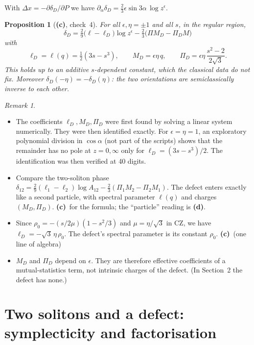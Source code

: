 \documentclass[11pt,a4paper]{article}
\newcommand{\Lc}{\textsf{\textbf{(c)}}}\newcommand{\Ld}{\textsf{\textbf{(d)}}}
\newtheorem{proposition}{Proposition}\theoremstyle{remark}\newtheorem{remark}{Remark}
\begin{document}
With $\Delta x=-\partial\delta_D/\partial P$ we have $\partial_\alpha\delta_D=\tfrac23\epsilon\sin3\alpha\,\log z^\epsilon$.

\begin{proposition}[\Lc, check~4]\label{prop:dD}
For all $\epsilon,\eta=\pm1$ and all $s$, in the regular region,
\begin{equation}\label{eq:dD}
\boxed{\ \delta_D=\tfrac29\big(\ell-\ell_D\big)\log z^{\epsilon}-\tfrac23\big(\Pi M_D-\Pi_D M\big)\ }
\end{equation}
with
\[
\ell_D=\ell(q)=\tfrac12(3s-s^3),\qquad M_D=\epsilon\eta\,q,\qquad \Pi_D=\epsilon\eta\,\frac{s^2-2}{2\sqrt3} .
\]
This holds up to an additive $s$-dependent constant, which the classical data do not fix. Moreover $\delta_D(-\eta)=-\delta_D(\eta)$: the two orientations are semiclassically inverse to each other.
\end{proposition}

\begin{remark}
\begin{itemize}
\item The coefficients $\ell_D,M_D,\Pi_D$ were first found by solving a linear system numerically. They were then identified exactly. For $\epsilon=\eta=1$, an exploratory polynomial division in $\cos\alpha$ (not part of the scripts) shows that the remainder has no pole at $z=0,\infty$ only for $\ell_D=(3s-s^3)/2$. The identification was then verified at 40 digits.
\item Compare the two-soliton phase $\delta_{12}=\tfrac29(\ell_1-\ell_2)\log A_{12}-\tfrac23(\Pi_1M_2-\Pi_2M_1)$. The defect enters exactly like a second particle, with spectral parameter $\ell(q)$ and charges $(M_D,\Pi_D)$. \Lc\ for the formula; the ``particle'' reading is \Ld.
\item Since $\rho_0=-(s/2\mu)(1-s^2/3)$ and $\mu=\eta/\sqrt3$ in CZ, we have $\ell_D=-\sqrt3\,\eta\,\rho_0$. The defect's spectral parameter is its constant $\rho_0$. \Lc\ (one line of algebra)
\item $M_D$ and $\Pi_D$ depend on $\epsilon$. They are therefore effective coefficients of a mutual-statistics term, not intrinsic charges of the defect. (In Section~2 the defect has none.)
\end{itemize}
\end{remark}

\section{Two solitons and a defect: symplecticity and factorisation}
\end{document}
